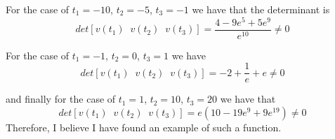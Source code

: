 \documentclass[a4paper, 11pt]{article}
\newenvironment{solution}{%
	\begin{list}{}{%
			\setlength{\topsep}{0pt}%
			\setlength{\leftmargin}{1.5cm}%
			\setlength{\rightmargin}{1.5cm}%
			\setlength{\listparindent}{\parindent}%
			\setlength{\itemindent}{\parindent}%
			\setlength{\parsep}{\parskip}%
		}%
		\item[]}{\end{list}}
\begin{document}
\begin{solution}
  \noindent For the case of $t_1 = -10$, $t_2 = -5$, $t_3=-1$ we have that the determinant is
  \begin{equation*}
    det[v(t_1)\;\; v(t_2)\;\; v(t_3)] =\frac{4 - 9 e^5 + 5 e^9}{e^{10}} \neq 0
  \end{equation*}

  \noindent For the case of $t_1=-1$, $t_2=0$, $t_3=1$ we have
  \begin{equation*}
    det[v(t_1)\;\; v(t_2)\;\; v(t_3)] = -2 + \frac{1}{e}+e \neq 0
  \end{equation*}

  \noindent and finally for the case of $t_1=1$, $t_2=10$, $t_3=20$ we have that
  \begin{equation*}
    det[v(t_1)\;\; v(t_2)\;\; v(t_3)] =e (10 - 19 e^9 + 9 e^{19})\neq 0
  \end{equation*}
Therefore, I believe I have found an example of such a function. 

\end{solution}
\end{document}
